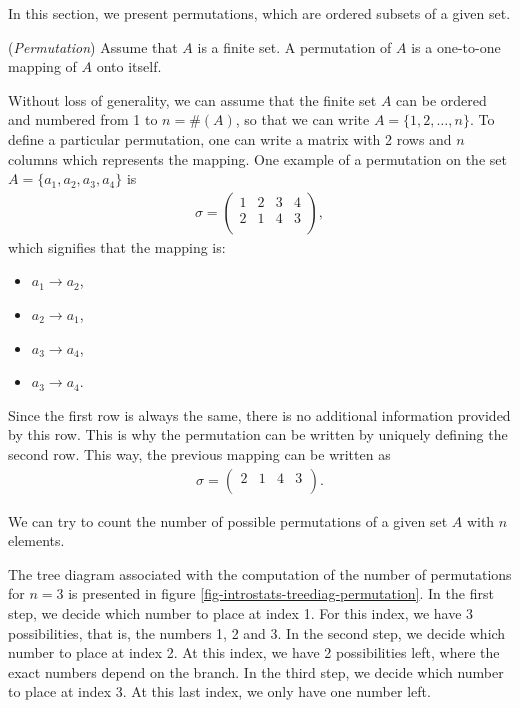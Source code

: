 In this section, we present permutations, which are ordered subsets
of a given set.

\begin{definition}
(\emph{Permutation})
Assume that $A$ is a finite set. A permutation of $A$ is a one-to-one mapping
of $A$ onto itself.
\end{definition}

Without loss of generality, we can assume that the finite set $A$ can be
ordered and numbered from 1 to $n=\#(A)$, so that we can 
write $A=\{1,2,\ldots,n\}$. To define a particular permutation, one 
can write a matrix with 2 rows and $n$ columns which represents the 
mapping. One example of a permutation on the set $A=\{a_1,a_2,a_3,a_4\}$ is 
\begin{eqnarray}
\sigma = 
\left(
\begin{array}{cccc}
1 & 2 & 3 & 4\\
2 & 1 & 4 & 3\\
\end{array}
\right),
\end{eqnarray}
which signifies that the mapping is:
\begin{itemize}
\item $a_1\rightarrow a_2$, 
\item $a_2\rightarrow a_1$, 
\item $a_3\rightarrow a_4$, 
\item $a_3\rightarrow a_4$.
\end{itemize}
Since the first row is always the same, there is no additional information
provided by this row. This is why the permutation can be written by uniquely
defining the second row. This way, the previous mapping can be written as
\begin{eqnarray}
\sigma = 
\left(
\begin{array}{cccc}
2 & 1 & 4 & 3\\
\end{array}
\right).
\end{eqnarray}

We can try to count the number of possible permutations of a given set $A$
with $n$ elements. 

The tree diagram associated with the computation of the number of 
permutations for $n=3$ is presented in figure \ref{fig-introstats-treediag-permutation}.
In the first step, we decide which number to place at index 1. For this index,
we have 3 possibilities, that is, the numbers 1, 2 and 3. In the second
step, we decide which number to place at index 2. At this index, we have 
2 possibilities left, where the exact numbers depend on the branch.
In the third step, we decide which number to place at index 3. At this last index,
we only have one number left.

